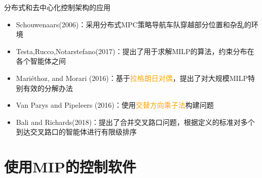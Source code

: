 \documentclass[notheorems,11pt]{beamer}
\theoremstyle{plain}
\numberwithin{theorem}{section}
\numberwithin{lemma}{section}
\numberwithin{corollary}{section}
\theoremstyle{example}
\newcommand{\hl}[1]{\textcolor{orange}{#1}}
\begin{document}
\begin{frame}{分布式和去中心化控制架构的应用}
  \begin{itemize}
    \item Schouwenaars(2006)：采用分布式MPC策略导航车队穿越部分位置和杂乱的环境
    \item Testa,Rucco,Notarstefano(2017)：提出了用于求解MILP的算法，约束分布在各个智能体之间
    \item Mariéthoz, and Morari (2016)：基于\hl{拉格朗日对偶}，提出了对大规模MILP特别有效的分解办法
    \item Van Parys and Pipeleers (2016)：使用\hl{交替方向乘子法}构建问题
  \end{itemize}
  \begin{itemize}
    \item Bali and Richards(2018)：提出了合并交叉路口问题，根据定义的标准对多个到达交叉路口的智能体进行有限级排序
  \end{itemize}
\end{frame}






\section{使用MIP的控制软件}
\end{document}
